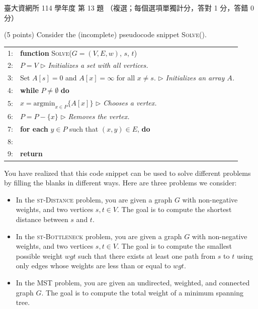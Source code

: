 \begin{pastexam}[label={px:ntu-114-dsa-13}]{臺大資網所 114 學年度 第 13 題}
（複選；每個選項單獨計分，答對 1 分，答錯 0 分）

(5 points) Consider the (incomplete) pseudocode snippet \textsc{Solve}().
\begin{center}
\small
\begin{tabular}{rl}
\hline
1: & \textbf{function} \textsc{Solve}($G=(V,E,w)$, $s$, $t$) \\
2: & \quad $P=V$ \hfill $\triangleright$ \textit{Initializes a set with all vertices.} \\
3: & \quad Set $A[s]=0$ and $A[x]=\infty$ for all $x\neq s$. \hfill $\triangleright$ \textit{Initializes an array
$A$.} \\
4: & \quad \textbf{while} $P\neq\emptyset$ \textbf{do} \\
5: & \quad\quad $x=\mathrm{argmin}_{x\in P}\{A[x]\}$ \hfill $\triangleright$ \textit{Chooses a vertex.} \\
6: & \quad\quad $P=P-\{x\}$ \hfill $\triangleright$ \textit{Removes the vertex.} \\
7: & \quad\quad \textbf{for each} $y\in P$ such that $(x,y)\in E$, \textbf{do} \\
8: & \quad\quad\quad \fbox{\makebox[4cm]{($\star$)}} \\
9: & \quad \textbf{return} \fbox{\makebox[4cm]{($\star\star$)}} \\
\hline
\end{tabular}
\end{center}
You have realized that this code snippet can be used to solve different problems by filling the blanks in
different ways. Here are three problems we consider:
\begin{itemize}
\item In the \textsc{st-Distance} problem, you are given a graph $G$ with non-negative weights, and two vertices
$s,t\in V$. The goal is to compute the shortest distance between $s$ and $t$.
\item In the \textsc{st-Bottleneck} problem, you are given a graph $G$ with non-negative weights, and two vertices
$s,t\in V$. The goal is to compute the smallest possible weight $wgt$ such that there exists at least one path
from $s$ to $t$ using only edges whose weights are less than or equal to $wgt$.
\item In the MST problem, you are given an undirected, weighted, and connected graph $G$. The goal is to compute
the total weight of a minimum spanning tree.

\end{itemize}
\end{pastexam}
